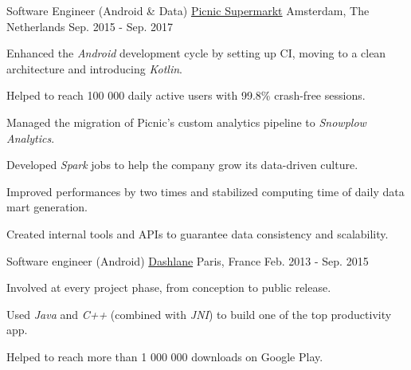 
	\begin{cventries}
	
		\cventry
			{Software Engineer (Android \& Data)}
			{\href{https://www.picnic.nl}{Picnic Supermarkt}}
			{Amsterdam, The Netherlands}
			{Sep. 2015 - Sep. 2017}
			{
				\begin{cvitems}
					\item Enhanced the \textit{Android} development cycle by setting up CI, moving to a clean architecture and introducing \textit{Kotlin}.
					\item Helped to reach 100 000 daily active users with 99.8\% crash-free sessions.
					\item Managed the migration of Picnic's custom analytics pipeline to \textit{Snowplow Analytics}.
					\item Developed \textit{Spark} jobs to help the company grow its data-driven culture.
					\item Improved performances by two times and stabilized computing time of daily data mart generation.
					\item Created internal tools and APIs to guarantee data consistency and scalability.
				\end{cvitems}
			}
		
		\cventry
			{Software engineer (Android)}
			{\href{https://www.dashlane.com}{Dashlane}}
			{Paris, France}
			{Feb. 2013 - Sep. 2015}
			{
				\begin{cvitems}
					\item Involved at every project phase, from conception to public release.
					\item Used \textit{Java} and \textit{C++} (combined with \textit{JNI}) to build one of the top productivity app.
					\item Helped to reach more than 1 000 000 downloads on Google Play.
				\end{cvitems}
			}
		

\end{cventries}
